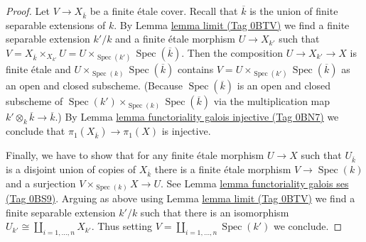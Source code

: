 \documentclass{amsart}
\theoremstyle{plain}
\theoremstyle{definition}
\theoremstyle{remark}
\numberwithin{equation}{subsection}
\def\Spec{\mathop{\mathrm{Spec}}}
\begin{document}
\begin{proof}
\medskip\noindent
Let $V \to X_{\overline{k}}$ be a finite \'etale cover. Recall that
$\overline{k}$ is the union of finite separable extensions of $k$.
By Lemma \href{https://stacks.math.columbia.edu/tag/0BTV}{lemma limit (Tag 0BTV)} we find a finite separable extension $k'/k$
and a finite \'etale morphism $U \to X_{k'}$ such that
$V = X_{\overline{k}} \times_{X_{k'}} U =
U \times_{\Spec(k')} \Spec(\overline{k})$.
Then the composition $U \to X_{k'} \to X$ is finite \'etale
and $U \times_{\Spec(k)} \Spec(\overline{k})$
contains $V = U \times_{\Spec(k')} \Spec(\overline{k})$
as an open and closed subscheme. (Because $\Spec(\overline{k})$
is an open and closed subscheme of
$\Spec(k') \times_{\Spec(k)} \Spec(\overline{k})$ via
the multiplication map $k' \otimes_k \overline{k} \to \overline{k}$.) By
Lemma \href{https://stacks.math.columbia.edu/tag/0BN7}{lemma functoriality galois injective (Tag 0BN7)}
we conclude that $\pi_1(X_{\overline{k}}) \to \pi_1(X)$ is injective.

\medskip\noindent
Finally, we have to show that for any finite \'etale morphism
$U \to X$ such that $U_{\overline{k}}$ is a disjoint union
of copies of $X_{\overline{k}}$ there is a finite \'etale
morphism $V \to \Spec(k)$ and a surjection $V \times_{\Spec(k)} X \to U$.
See Lemma \href{https://stacks.math.columbia.edu/tag/0BS9}{lemma functoriality galois ses (Tag 0BS9)}.
Arguing as above using Lemma \href{https://stacks.math.columbia.edu/tag/0BTV}{lemma limit (Tag 0BTV)}
we find a finite separable extension $k'/k$
such that there is an isomorphism
$U_{k'} \cong \coprod_{i = 1, \ldots, n} X_{k'}$.
Thus setting $V = \coprod_{i = 1, \ldots, n} \Spec(k')$
we conclude.
\end{proof}
\end{document}
